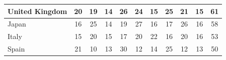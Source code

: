 \documentclass[12pt]{article}  %
\begin{document}
\begin{subappendices}
\begin{longtable}{|l|c|c|c|c|c|c|c|c|c|c|}
	\hline
	United Kingdom                                                 & 20                                                                     & 19                                                                     & 14                                                                     & 26                                                                     & 24                                                                     & 15                                                                     & 25                        & 21                          & 15                          & 61                          \\ 
	\hline
	Japan                                                          & 16                                                                     & 25                                                                     & 14                                                                     & 19                                                                     & 27                                                                     & 16                                                                     & 17                        & 26                          & 16                          & 58                          \\ 
	\hline
	Italy                                                          & 15                                                                     & 20                                                                     & 15                                                                     & 17                                                                     & 20                                                                     & 22                                                                     & 16                        & 20                          & 16                          & 53                          \\ 
	\hline
	Spain                                                          & 21                                                                     & 10                                                                     & 13                                                                     & 30                                                                     & 12                                                                     & 14                                                                     & 25                        & 12                          & 13                          & 50                          \\ 

\end{longtable}
\end{subappendices}
\end{document}

